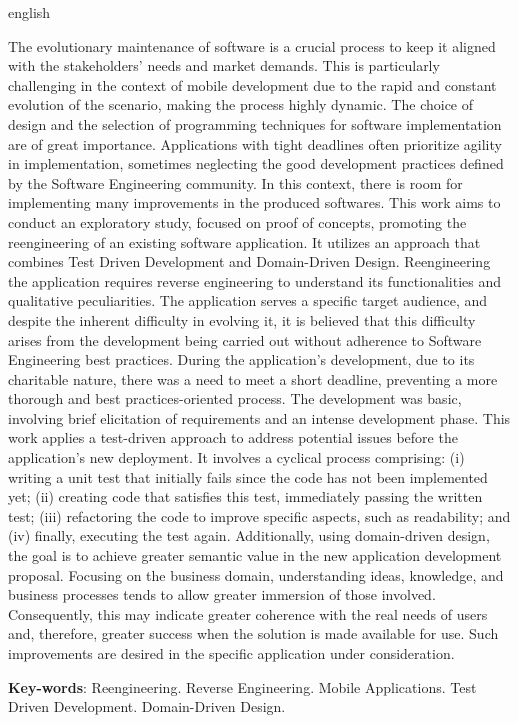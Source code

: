 \begin{resumo}[Abstract]
 \begin{otherlanguage*}{english}

The evolutionary maintenance of software is a crucial process to keep it 
aligned with the stakeholders' needs and market demands. This is particularly 
challenging in the context of mobile development due to the rapid and constant 
evolution of the scenario, making the process highly dynamic. The choice of design and the selection of programming techniques for software implementation are of great importance. Applications with tight deadlines often prioritize agility in implementation, sometimes neglecting the good development practices defined by the Software Engineering community. In this context, there is room for implementing many improvements in the produced softwares.
This work aims to conduct an exploratory study, focused on proof of concepts, promoting the reengineering of an existing software application. It utilizes an approach that combines Test Driven Development and Domain-Driven Design. Reengineering the application requires reverse engineering to understand its functionalities and qualitative peculiarities. The application serves a specific target audience, and despite the inherent difficulty in evolving it, it is believed that this difficulty arises from the development being carried out without adherence to Software Engineering best practices. During the application's development, due to its charitable nature, there was a need to meet a short deadline, preventing a more thorough and best practices-oriented process. The development was basic, involving brief elicitation of requirements and an intense development phase.
This work applies a test-driven approach to address potential issues before the application's new deployment. It involves a cyclical process comprising: (i) writing a unit test that initially fails since the code has not been implemented yet; (ii) creating code that satisfies this test, immediately passing the written test; (iii) refactoring the code to improve specific aspects, such as readability; and (iv) finally, executing the test again. Additionally, using domain-driven design, the goal is to achieve greater semantic value in the new application development proposal. Focusing on the business domain, understanding ideas, knowledge, and business processes tends to allow greater immersion of those involved. Consequently, this may indicate greater coherence with the real needs of users and, therefore, greater success when the solution is made available for use. Such improvements are desired in the specific application under consideration.

   \vspace{\onelineskip}
 
   \noindent 
   \textbf{Key-words}: Reengineering. Reverse Engineering. Mobile Applications. Test Driven Development. Domain-Driven Design.
 \end{otherlanguage*}
\end{resumo}
